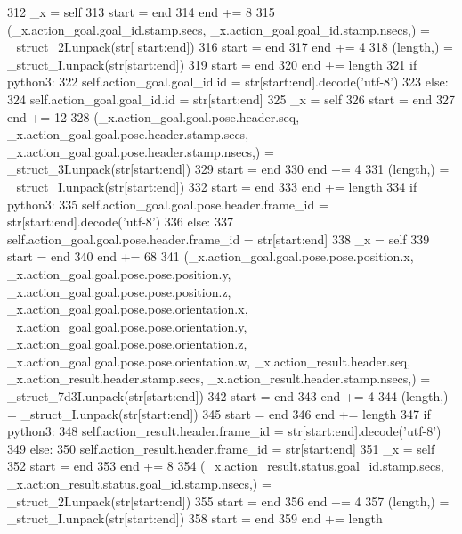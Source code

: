 \begin{DoxyCode}
312       \_x = self
313       start = end
314       end += 8
315       (\_x.action\_goal.goal\_id.stamp.secs, \_x.action\_goal.goal\_id.stamp.nsecs,) = \_struct\_2I.unpack(str[
      start:end])
316       start = end
317       end += 4
318       (length,) = \_struct\_I.unpack(str[start:end])
319       start = end
320       end += length
321       \textcolor{keywordflow}{if} python3:
322         self.action\_goal.goal\_id.id = str[start:end].decode(\textcolor{stringliteral}{'utf-8'})
323       \textcolor{keywordflow}{else}:
324         self.action\_goal.goal\_id.id = str[start:end]
325       \_x = self
326       start = end
327       end += 12
328       (\_x.action\_goal.goal.pose.header.seq, \_x.action\_goal.goal.pose.header.stamp.secs, 
      \_x.action\_goal.goal.pose.header.stamp.nsecs,) = \_struct\_3I.unpack(str[start:end])
329       start = end
330       end += 4
331       (length,) = \_struct\_I.unpack(str[start:end])
332       start = end
333       end += length
334       \textcolor{keywordflow}{if} python3:
335         self.action\_goal.goal.pose.header.frame\_id = str[start:end].decode(\textcolor{stringliteral}{'utf-8'})
336       \textcolor{keywordflow}{else}:
337         self.action\_goal.goal.pose.header.frame\_id = str[start:end]
338       \_x = self
339       start = end
340       end += 68
341       (\_x.action\_goal.goal.pose.pose.position.x, \_x.action\_goal.goal.pose.pose.position.y, 
      \_x.action\_goal.goal.pose.pose.position.z, \_x.action\_goal.goal.pose.pose.orientation.x, 
      \_x.action\_goal.goal.pose.pose.orientation.y, \_x.action\_goal.goal.pose.pose.orientation.z, \_x.action\_goal.goal.pose.pose.orientation.w, 
      \_x.action\_result.header.seq, \_x.action\_result.header.stamp.secs, \_x.action\_result.header.stamp.nsecs,) = 
      \_struct\_7d3I.unpack(str[start:end])
342       start = end
343       end += 4
344       (length,) = \_struct\_I.unpack(str[start:end])
345       start = end
346       end += length
347       \textcolor{keywordflow}{if} python3:
348         self.action\_result.header.frame\_id = str[start:end].decode(\textcolor{stringliteral}{'utf-8'})
349       \textcolor{keywordflow}{else}:
350         self.action\_result.header.frame\_id = str[start:end]
351       \_x = self
352       start = end
353       end += 8
354       (\_x.action\_result.status.goal\_id.stamp.secs, \_x.action\_result.status.goal\_id.stamp.nsecs,) = 
      \_struct\_2I.unpack(str[start:end])
355       start = end
356       end += 4
357       (length,) = \_struct\_I.unpack(str[start:end])
358       start = end
359       end += length

\end{DoxyCode}
